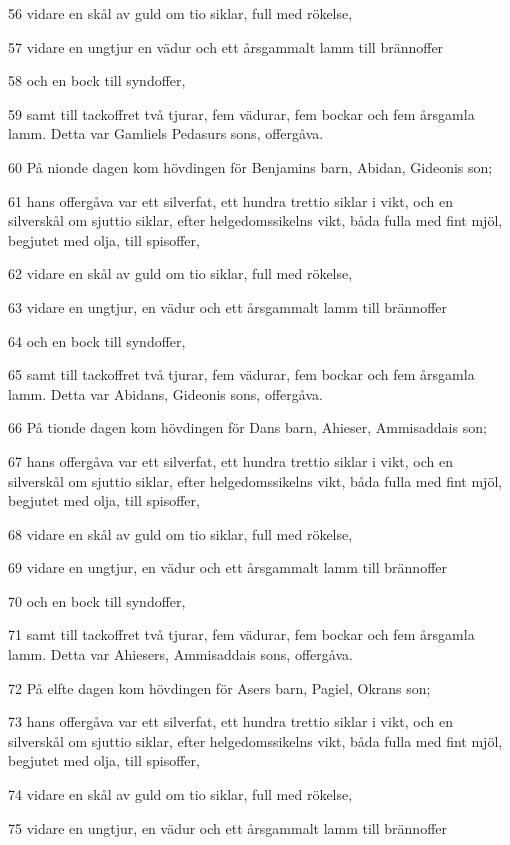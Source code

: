 \par 56 vidare en skål av guld om tio siklar, full med rökelse,
\par 57 vidare en ungtjur en vädur och ett årsgammalt lamm till brännoffer
\par 58 och en bock till syndoffer,
\par 59 samt till tackoffret två tjurar, fem vädurar, fem bockar och fem årsgamla lamm. Detta var Gamliels Pedasurs sons, offergåva.
\par 60 På nionde dagen kom hövdingen för Benjamins barn, Abidan, Gideonis son;
\par 61 hans offergåva var ett silverfat, ett hundra trettio siklar i vikt, och en silverskål om sjuttio siklar, efter helgedomssikelns vikt, båda fulla med fint mjöl, begjutet med olja, till spisoffer,
\par 62 vidare en skål av guld om tio siklar, full med rökelse,
\par 63 vidare en ungtjur, en vädur och ett årsgammalt lamm till brännoffer
\par 64 och en bock till syndoffer,
\par 65 samt till tackoffret två tjurar, fem vädurar, fem bockar och fem årsgamla lamm. Detta var Abidans, Gideonis sons, offergåva.
\par 66 På tionde dagen kom hövdingen för Dans barn, Ahieser, Ammisaddais son;
\par 67 hans offergåva var ett silverfat, ett hundra trettio siklar i vikt, och en silverskål om sjuttio siklar, efter helgedomssikelns vikt, båda fulla med fint mjöl, begjutet med olja, till spisoffer,
\par 68 vidare en skål av guld om tio siklar, full med rökelse,
\par 69 vidare en ungtjur, en vädur och ett årsgammalt lamm till brännoffer
\par 70 och en bock till syndoffer,
\par 71 samt till tackoffret två tjurar, fem vädurar, fem bockar och fem årsgamla lamm. Detta var Ahiesers, Ammisaddais sons, offergåva.
\par 72 På elfte dagen kom hövdingen för Asers barn, Pagiel, Okrans son;
\par 73 hans offergåva var ett silverfat, ett hundra trettio siklar i vikt, och en silverskål om sjuttio siklar, efter helgedomssikelns vikt, båda fulla med fint mjöl, begjutet med olja, till spisoffer,
\par 74 vidare en skål av guld om tio siklar, full med rökelse,
\par 75 vidare en ungtjur, en vädur och ett årsgammalt lamm till brännoffer
